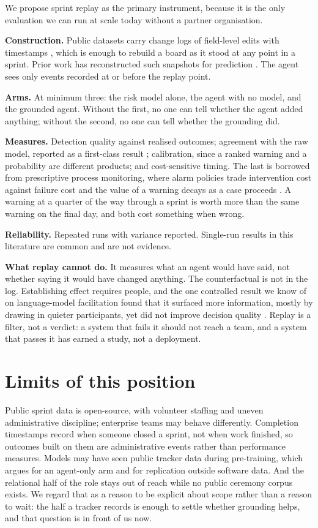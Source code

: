\documentclass[conference]{IEEEtran}
\begin{document}
We propose sprint replay as the primary instrument, because it is the only evaluation we can run at scale today without a partner organisation.

\textbf{Construction.} Public datasets carry change logs of field-level edits with timestamps \cite{tawos}, which is enough to rebuild a board as it stood at any point in a sprint. Prior work has reconstructed such snapshots for prediction \cite{tse2018}. The agent sees only events recorded at or before the replay point.

\textbf{Arms.} At minimum three: the risk model alone, the agent with no model, and the grounded agent. Without the first, no one can tell whether the agent added anything; without the second, no one can tell whether the grounding did.

\textbf{Measures.} Detection quality against realised outcomes; agreement with the raw model, reported as a first-class result \cite{tool}; calibration, since a ranked warning and a probability are different products; and cost-sensitive timing. The last is borrowed from prescriptive process monitoring, where alarm policies trade intervention cost against failure cost and the value of a warning decays as a case proceeds \cite{alarm}. A warning at a quarter of the way through a sprint is worth more than the same warning on the final day, and both cost something when wrong.

\textbf{Reliability.} Repeated runs with variance reported. Single-run results in this literature are common and are not evidence.

\textbf{What replay cannot do.} It measures what an agent would have said, not whether saying it would have changed anything. The counterfactual is not in the log. Establishing effect requires people, and the one controlled result we know of on language-model facilitation found that it surfaced more information, mostly by drawing in quieter participants, yet did not improve decision quality \cite{alsobay}. Replay is a filter, not a verdict: a system that fails it should not reach a team, and a system that passes it has earned a study, not a deployment.

\section{Limits of this position}

Public sprint data is open-source, with volunteer staffing and uneven administrative discipline; enterprise teams may behave differently. Completion timestamps record when someone closed a sprint, not when work finished, so outcomes built on them are administrative events rather than performance measures. Models may have seen public tracker data during pre-training, which argues for an agent-only arm and for replication outside software data. And the relational half of the role stays out of reach while no public ceremony corpus exists. We regard that as a reason to be explicit about scope rather than a reason to wait: the half a tracker records is enough to settle whether grounding helps, and that question is in front of us now.
\end{document}
